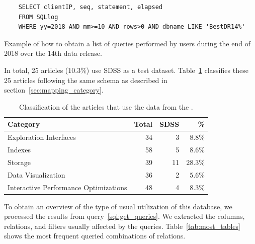 \begin{listing}[htbp]
\begin{verbatim}
    SELECT clientIP, seq, statement, elapsed
    FROM SQLlog
    WHERE yy=2018 AND mm>=10 AND rows>0 AND dbname LIKE 'BestDR14%'
\end{verbatim}
\caption[Obtaining a list of queries performed by  users.]{
    Example of how to obtain a list of queries performed by users during the end of 2018 over the 14th data release.
}\label{sql:get_queries}
\end{listing}

In total, 25 articles ($10.3\%$) use \gls{SDSS} as a test dataset.
Table~\ref{tab:sdss_queries_count} classifies these 25 articles following the same schema as described
in section~\ref{sec:mapping_category}.

\begin{table}[htbp]
  \begin{center}
    \begin{tabular}{l r r r}
      \textbf{Category} & \textbf{Total} & \textbf{SDSS} & \textbf{\%} \\ \hline
      Exploration Interfaces & 34 & 3 & $8.8\%$ \\
      Indexes & 58 & 5 & $8.6\%$ \\
      Storage & 39 & 11 & $28.3\%$ \\
      Data Visualization & 36 & 2 & $5.6\%$ \\
      Interactive Performance Optimizations & 48 & 4 & $8.3\%$ \\
    \end{tabular}
  \end{center}
  \caption{Classification of the articles that use the data from the .}\label{tab:sdss_queries_count}
\end{table}

To obtain an overview of the type of usual utilization of this database, we processed
the results from query~\ref{sql:get_queries}. We extracted the columns, relations,
and filters usually affected by the queries.
Table~\ref{tab:most_tables} shows the most frequent queried combinations
of relations.

